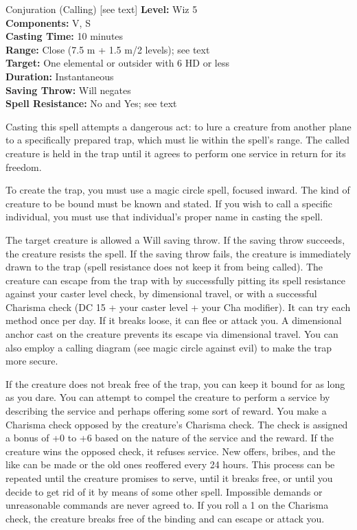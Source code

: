 {Conjuration (Calling) [see text]}
{
	\textbf{Level:}
	Wiz 5\\
	\textbf{Components:}
	V, S\\
	\textbf{Casting Time:}
	10 minutes\\
	\textbf{Range:}
	Close (7.5 m + 1.5 m/2 levels); see text\\
	\textbf{Target:}
	One elemental or outsider with 6 HD or less\\
	\textbf{Duration:}
	Instantaneous\\
	\textbf{Saving Throw:}
	Will negates\\
	\textbf{Spell Resistance:}
	No and Yes; see text\\
}
{
	Casting this spell attempts a dangerous act: to lure a creature from another plane to a specifically prepared trap, which must lie within the spell's range. The called creature is held in the trap until it agrees to perform one service in return for its freedom.

	To create the trap, you must use a magic circle spell, focused inward. The kind of creature to be bound must be known and stated. If you wish to call a specific individual, you must use that individual's proper name in casting the spell.

	The target creature is allowed a Will saving throw. If the saving throw succeeds, the creature resists the spell. If the saving throw fails, the creature is immediately drawn to the trap (spell resistance does not keep it from being called). The creature can escape from the trap with by successfully pitting its spell resistance against your caster level check, by dimensional travel, or with a successful Charisma check (DC 15 + \onehalf your caster level + your Cha modifier). It can try each method once per day. If it breaks loose, it can flee or attack you. A dimensional anchor cast on the creature prevents its escape via dimensional travel. You can also employ a calling diagram (see magic circle against evil) to make the trap more secure.

	If the creature does not break free of the trap, you can keep it bound for as long as you dare. You can attempt to compel the creature to perform a service by describing the service and perhaps offering some sort of reward. You make a Charisma check opposed by the creature's Charisma check. The check is assigned a bonus of +0 to +6 based on the nature of the service and the reward. If the creature wins the opposed check, it refuses service. New offers, bribes, and the like can be made or the old ones reoffered every 24 hours. This process can be repeated until the creature promises to serve, until it breaks free, or until you decide to get rid of it by means of some other spell. Impossible demands or unreasonable commands are never agreed to. If you roll a 1 on the Charisma check, the creature breaks free of the binding and can escape or attack you.

}
